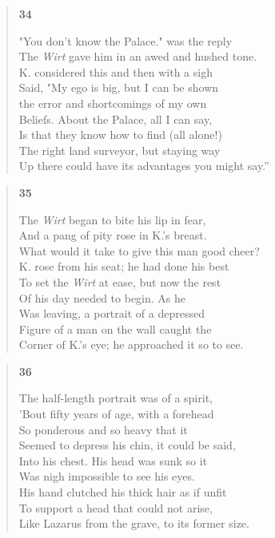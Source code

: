 \documentclass{article}
\begin{document}
\begin{verse}
  \begin{center}
    \textbf{34} \\
  \end{center}
  "You don't know the Palace." was the reply \\
  The \textit{Wirt} gave him in an awed and hushed tone. \\
  K. considered this and then with a sigh \\
  Said, "My ego is big, but I can be shown \\
  the error and shortcomings of my own \\
  Beliefs. About the Palace, all I can say, \\
  Is that they know how to find (all alone!) \\
  The right land surveyor, but staying way \\
  Up there could have its advantages you might say.''
\end{verse}

\begin{verse}
  \begin{center}
    \textbf{35} \\
  \end{center}
  The \textit{Wirt} began to bite his lip in fear, \\
  And a pang of pity rose in K.'s breast. \\
  What would it take to give this man good cheer? \\
  K. rose from his seat; he had done his best \\
  To set the \textit{Wirt} at ease, but now the rest \\
  Of his day needed to begin. As he \\
  Was leaving, a portrait of a depressed \\
  Figure of a man on the wall caught the \\
  Corner of K.'s eye; he approached it so to see.
\end{verse}

\newpage
\begin{verse}
  \begin{center}
    \textbf{36} \\
  \end{center}
  The half-length portrait was of a spirit,\\
  'Bout fifty years of age, with a forehead\\
  So ponderous and so heavy that it\\
  Seemed to depress his chin, it could be said,\\
  Into his chest. His head was sunk so it  \\
  Was nigh impossible to see his eyes.\\
  His hand clutched his thick hair as if unfit\\
  To support a head that could not arise,\\
  Like Lazarus from the grave, to its former size.
\end{verse}
\end{document}
